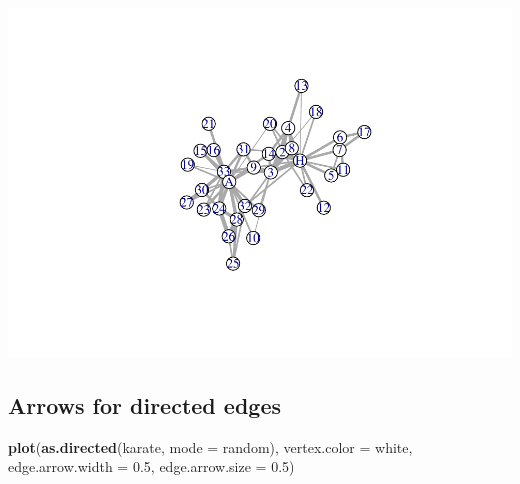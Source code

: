 \documentclass[
]{book}
\newenvironment{Shaded}{\begin{snugshade}}{\end{snugshade}}
\newcommand{\AttributeTok}[1]{\textcolor[rgb]{0.13,0.29,0.53}{#1}}
\newcommand{\FloatTok}[1]{\textcolor[rgb]{0.00,0.00,0.81}{#1}}
\newcommand{\FunctionTok}[1]{\textcolor[rgb]{0.13,0.29,0.53}{\textbf{#1}}}
\newcommand{\NormalTok}[1]{#1}
\newcommand{\SpecialCharTok}[1]{\textcolor[rgb]{0.81,0.36,0.00}{\textbf{#1}}}
\newcommand{\StringTok}[1]{\textcolor[rgb]{0.31,0.60,0.02}{#1}}
\begin{document}
\begin{Shaded}
\end{Shaded}

\includegraphics{bookdown-demo_files/figure-latex/unnamed-chunk-133-1.pdf}

\subsection{Arrows for directed edges}\label{arrows-for-directed-edges}

\begin{Shaded}
\begin{Highlighting}[]
\FunctionTok{plot}\NormalTok{(}\FunctionTok{as.directed}\NormalTok{(karate, }\AttributeTok{mode =} \StringTok{\textquotesingle{}random\textquotesingle{}}\NormalTok{), }\AttributeTok{vertex.color =} \StringTok{\textquotesingle{}white\textquotesingle{}}\NormalTok{, }\AttributeTok{edge.arrow.width =} \FloatTok{0.5}\NormalTok{, }\AttributeTok{edge.arrow.size =} \FloatTok{0.5}\NormalTok{)}
\end{Highlighting}
\end{Shaded}
\end{document}
